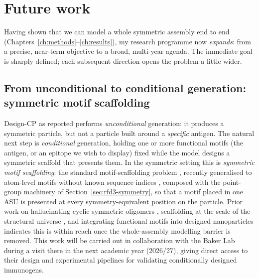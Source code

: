 \chapter{Future work}
\label{ch:future-work}


Having shown that we can model a whole symmetric assembly end to end
(Chapters~\ref{ch:methods}--\ref{ch:results}), my research programme now
\emph{expands}: from a precise, near-term objective to a broad, multi-year agenda.
The immediate goal is sharply defined; each subsequent direction opens the problem
a little wider.

\section{From unconditional to conditional generation: symmetric motif scaffolding}
\label{sec:motif-scaffolding}

Design-CP as reported performs \emph{unconditional} generation: it produces a
symmetric particle, but not a particle built around a \emph{specific} antigen. The
natural next step is \emph{conditional} generation, holding one or more functional
motifs (the antigen, or an epitope we wish to display) fixed while the model
designs a symmetric scaffold that presents them. In the symmetric setting this is
\emph{symmetric motif scaffolding}: the standard motif-scaffolding problem
\parencite{watsonNovoDesignProtein2023,didiFrameworkConditionalDiffusion2024},
recently generalised to atom-level motifs without known sequence indices
\parencite{ahern_atom_2025}, composed with the
point-group machinery of Section~\ref{sec:rfd3-symmetry}, so that a motif placed in
one ASU is presented at every symmetry-equivalent position on the particle. Prior
work on hallucinating cyclic symmetric oligomers
\parencite{wickyHallucinatingSymmetricProtein2022}, scaffolding at the scale of the
structural universe \parencite{lin_out_2024}, and integrating functional motifs
into designed nanoparticles \parencite{haas_novo_2026} indicates this is within
reach once the whole-assembly modelling barrier is removed. This work will be
carried out in collaboration with the Baker Lab during a visit there in the next
academic year (2026/27), giving direct access to their design and experimental
pipelines for validating conditionally designed immunogens.

